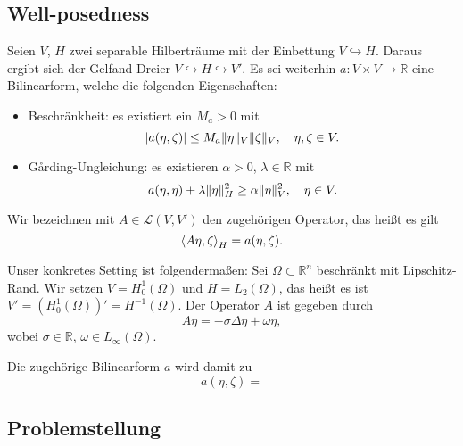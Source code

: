 \subsection{Well-posedness} %
\label{sub:well_posedness}

Seien $V$, $H$ zwei separable Hilberträume mit der Einbettung $V \hookrightarrow H$.
Daraus ergibt sich der Gelfand-Dreier $V \hookrightarrow H \hookrightarrow V'$.
Es sei weiterhin $a \colon V \times V \to \mathbb{R}$ eine Bilinearform, welche die folgenden Eigenschaften:
\begin{itemize}
    \item Beschränkheit: es existiert ein $M_{a} > 0$ mit
    \begin{equation}
        \lvert a(\eta, \zeta)\rvert \leq M_{a} \lVert\eta\rVert_{V} \lVert\zeta\rVert_{V}, \quad \eta, \zeta \in V.
    \end{equation}
    \item G\aa{}rding-Ungleichung: es existieren $\alpha > 0$, $\lambda \in \mathbb{R}$ mit
    \begin{equation}
        a(\eta, \eta) + \lambda \lVert\eta\rVert^{2}_{H} \geq \alpha \lVert\eta\rVert^{2}_{V}, \quad \eta \in V.
    \end{equation}
\end{itemize}
Wir bezeichnen mit $A \in \mathcal L(V, V')$ den zugehörigen Operator, das heißt es gilt
\begin{equation}
    \left\langle A \eta,\zeta\right\rangle_{H} = a(\eta, \zeta).
\end{equation}

Unser konkretes Setting ist folgendermaßen:
Sei $\Omega \subset \mathbb{R}^{n}$ beschränkt mit Lipschitz-Rand.
Wir setzen $V = H^{1}_{0}(\Omega)$ und $H = L_{2}(\Omega)$, das heißt es ist $V' = (H^{1}_{0}(\Omega))' = H^{-1}(\Omega)$.
Der Operator $A$ ist gegeben durch
\begin{equation}
    A \eta = - \sigma \Delta \eta + \omega \eta,
\end{equation}
wobei $\sigma \in \mathbb{R}$, $\omega \in L_{\infty}(\Omega)$.

Die zugehörige Bilinearform $a$ wird damit zu
\begin{equation}
    a(\eta, \zeta) =
\end{equation}


\clearpage

\subsection{Problemstellung} %
\label{sub:problemstellung}

